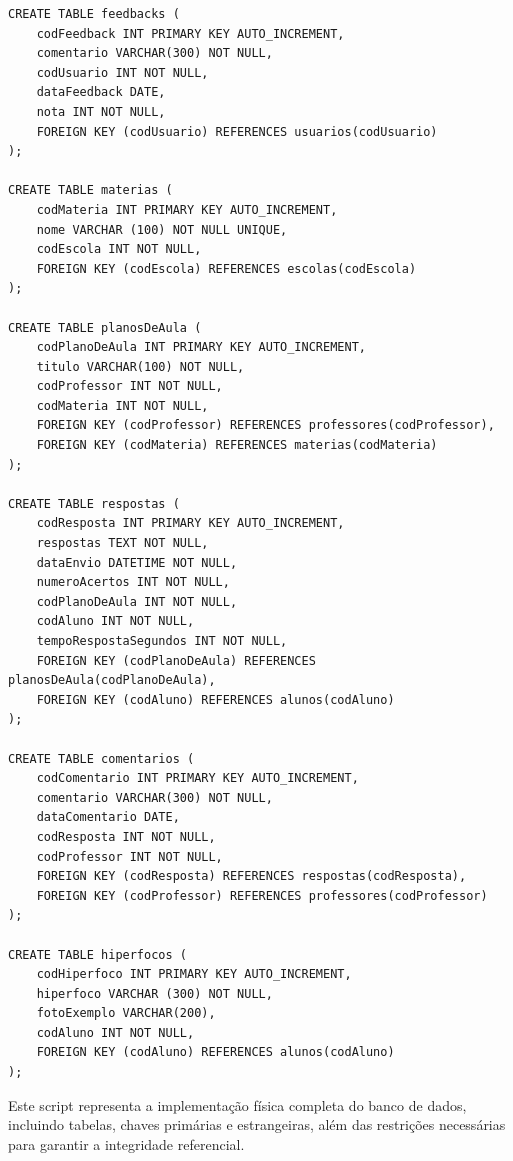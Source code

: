\documentclass[
  a4paper,
  12pt,
  english,
  brazilian,
]{article}
\begin{document}
\begin{lstlisting}[style=SQLstyle, caption={Script de criação do banco de dados}]
CREATE TABLE feedbacks (
    codFeedback INT PRIMARY KEY AUTO_INCREMENT,
    comentario VARCHAR(300) NOT NULL,
    codUsuario INT NOT NULL,
    dataFeedback DATE,
    nota INT NOT NULL,
    FOREIGN KEY (codUsuario) REFERENCES usuarios(codUsuario)
);

CREATE TABLE materias (
    codMateria INT PRIMARY KEY AUTO_INCREMENT,
    nome VARCHAR (100) NOT NULL UNIQUE,
    codEscola INT NOT NULL,
    FOREIGN KEY (codEscola) REFERENCES escolas(codEscola)
);

CREATE TABLE planosDeAula (
    codPlanoDeAula INT PRIMARY KEY AUTO_INCREMENT,
    titulo VARCHAR(100) NOT NULL,
    codProfessor INT NOT NULL,
    codMateria INT NOT NULL,
    FOREIGN KEY (codProfessor) REFERENCES professores(codProfessor),
    FOREIGN KEY (codMateria) REFERENCES materias(codMateria)
);

CREATE TABLE respostas (
    codResposta INT PRIMARY KEY AUTO_INCREMENT,
    respostas TEXT NOT NULL,
    dataEnvio DATETIME NOT NULL,
    numeroAcertos INT NOT NULL,
    codPlanoDeAula INT NOT NULL,
    codAluno INT NOT NULL,
    tempoRespostaSegundos INT NOT NULL,
    FOREIGN KEY (codPlanoDeAula) REFERENCES planosDeAula(codPlanoDeAula),
    FOREIGN KEY (codAluno) REFERENCES alunos(codAluno)
);

CREATE TABLE comentarios (
    codComentario INT PRIMARY KEY AUTO_INCREMENT,
    comentario VARCHAR(300) NOT NULL,
    dataComentario DATE,
    codResposta INT NOT NULL,
    codProfessor INT NOT NULL,
    FOREIGN KEY (codResposta) REFERENCES respostas(codResposta),
    FOREIGN KEY (codProfessor) REFERENCES professores(codProfessor)
);

CREATE TABLE hiperfocos (
    codHiperfoco INT PRIMARY KEY AUTO_INCREMENT,
    hiperfoco VARCHAR (300) NOT NULL,
    fotoExemplo VARCHAR(200),
    codAluno INT NOT NULL,
    FOREIGN KEY (codAluno) REFERENCES alunos(codAluno)
);
\end{lstlisting}

Este script representa a implementação física completa do banco de dados, incluindo tabelas, chaves primárias e estrangeiras, além das restrições necessárias para garantir a integridade referencial.
\end{document}

